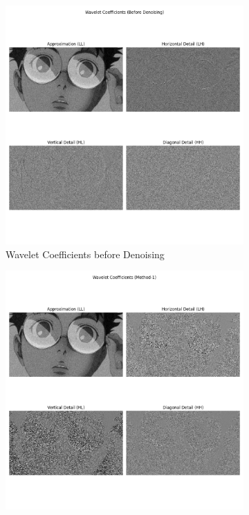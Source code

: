 \documentclass[12pt,a4paper]{article}
\begin{document}
\begin{figure}[H]
  \centering
  \begin{subfigure}[b]{0.48\textwidth}
    \centering
    \includegraphics[width=\textwidth]{wavelet/coefficients_before.png}
    \caption{Wavelet Coefficients before Denoising}
  \end{subfigure}
  \begin{subfigure}[b]{0.48\textwidth}
    \centering
    \includegraphics[width=\textwidth]{wavelet/coefficients_method1.png}

\end{subfigure}
\end{figure}
\end{document}
